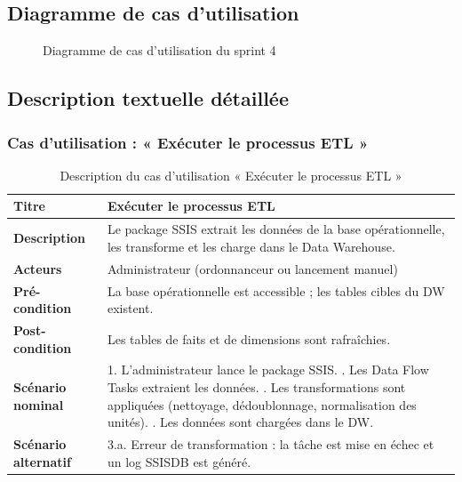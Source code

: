 \subsection{Diagramme de cas d'utilisation}
\begin{figure}[h!]
\centering
{}
\caption{Diagramme de cas d'utilisation du sprint 4}
\end{figure}

\subsection{Description textuelle détaillée}

\subsubsection{Cas d'utilisation : « Exécuter le processus ETL »}
\begin{table}[h!]
\centering
\renewcommand{\arraystretch}{1.3}
\begin{tabularx}{\textwidth}{|l|X|}
\hline
\textbf{Titre} & Exécuter le processus ETL \\ \hline
\textbf{Description} & Le package SSIS extrait les données de la base opérationnelle,
les transforme et les charge dans le Data Warehouse. \\ \hline
\textbf{Acteurs} & Administrateur (ordonnanceur ou lancement manuel) \\ \hline
\textbf{Pré-condition} & La base opérationnelle est accessible ; les tables cibles du
DW existent. \\ \hline
\textbf{Post-condition} & Les tables de faits et de dimensions sont rafraîchies. \\ \hline
\textbf{Scénario nominal} &
1. L'administrateur lance le package SSIS. \newline
2. Les Data Flow Tasks extraient les données. \newline
3. Les transformations sont appliquées (nettoyage, dédoublonnage,
normalisation des unités). \newline
4. Les données sont chargées dans le DW. \\ \hline
\textbf{Scénario alternatif} &
3.a. Erreur de transformation : la tâche est mise en échec et un log SSISDB est
généré. \\ \hline
\end{tabularx}
\caption{Description du cas d'utilisation « Exécuter le processus ETL »}
\end{table}


